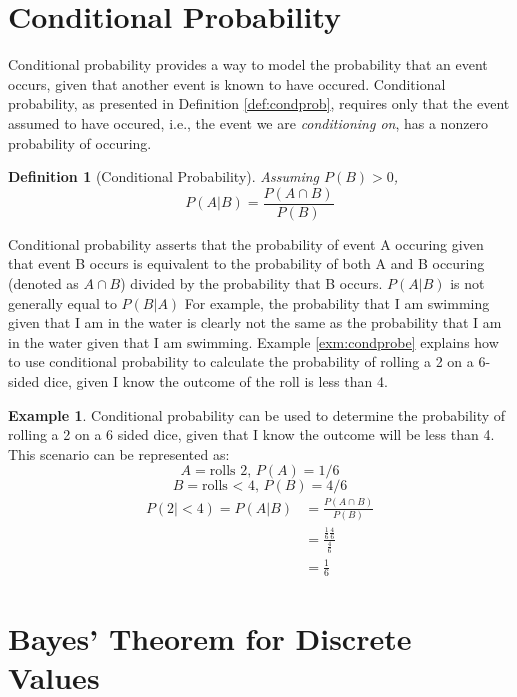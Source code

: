 \documentclass[
  12pt,
]{book}
\theoremstyle{definition}
\newtheorem{definition}{Definition}[chapter]
\theoremstyle{definition}
\newtheorem{example}{Example}[chapter]
\theoremstyle{definition}
\theoremstyle{remark}
\begin{document}
\hypertarget{conditional-probability}{%
\section{Conditional Probability}\label{conditional-probability}}

Conditional probability provides a way to model the probability that an event occurs, given that another event is known to have occured.
Conditional probability, as presented in Definition \ref{def:condprob}, requires only that the event assumed to have occured, i.e., the event we are \emph{conditioning on}, has a nonzero probability of occuring.

\begin{definition}[Conditional Probability]
\protect\hypertarget{def:condprob}{}{\label{def:condprob} {} }\emph{Assuming \(P(B)>0\),}
\[P(A|B)=\frac{P(A \cap B)}{P(B)}\]
\end{definition}

Conditional probability asserts that the probability of event A occuring given that event B occurs is equivalent to the probability of both A and B occuring (denoted as \(A \cap B\)) divided by the probability that B occurs. \(P(A|B)\) is not generally equal to \(P(B|A)\)
For example, the probability that I am swimming given that I am in the water is clearly not the same as the probability that I am in the water given that I am swimming.
Example \ref{exm:condprobe} explains how to use conditional probability to calculate the probability of rolling a 2 on a 6-sided dice, given I know the outcome of the roll is less than 4.

\begin{example}
\protect\hypertarget{exm:condprobe}{}{\label{exm:condprobe} }Conditional probability can be used to determine the probability of rolling a 2 on a 6 sided dice, given that I know the outcome will be less than 4. This scenario can be represented as:
\[A = \textrm{rolls 2, } P(A) = 1/6\]
\[B = \textrm{rolls < 4, } P(B) = 4/6\]
\[\begin{split}
P(2|<4) = P(A|B) & = \frac{P(A \cap B)}{P(B)} \\
  & = \frac{\frac{1}{6}\frac{4}{6}}{\frac{4}{6}} \\
  & = \frac{1}{6}
\end{split}\]
\end{example}

\hypertarget{bayes-theorem-for-discrete-values}{%
\section{Bayes' Theorem for Discrete Values}\label{bayes-theorem-for-discrete-values}}
\end{document}
